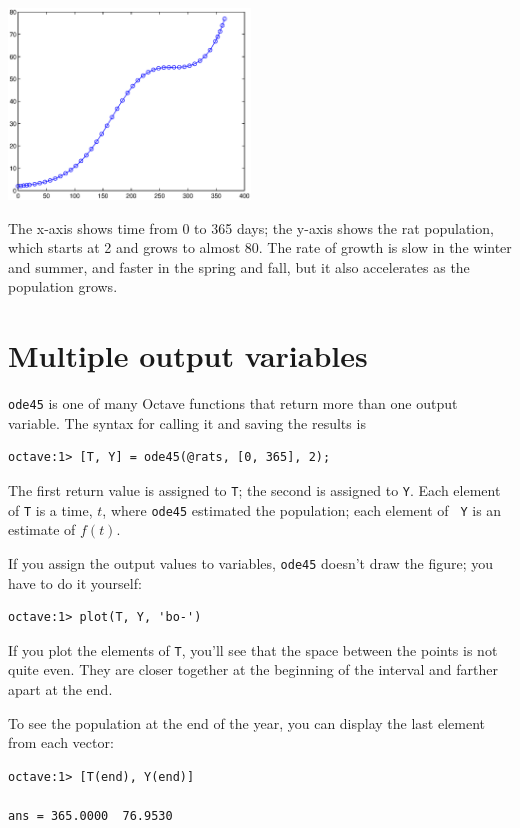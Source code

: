 \documentclass{book}
\begin{document}
\beforefig \centerline{\includegraphics[height=2in]{figs/rats.eps}}

The x-axis shows time from 0 to 365 days; the y-axis shows the rat
population, which starts at 2 and grows to almost 80. The rate
of growth is slow in the winter and summer, and faster in the
spring and fall, but it also accelerates as the population grows.


\section{Multiple output variables}
\label{rats}

{\tt ode45} is one of many Octave functions that return more
than one output variable. The syntax for calling it and saving
the results is

\begin{verbatim}
octave:1> [T, Y] = ode45(@rats, [0, 365], 2);
\end{verbatim}

The first return value is assigned to {\tt T}; the second is assigned
to {\tt Y}. Each element of {\tt T} is a time,
$t$, where {\tt ode45} estimated the population; each element of {\tt
Y} is an estimate of $f(t)$.

If you assign the output values to variables,
{\tt ode45} doesn't draw the figure;
you have to do it yourself:

\begin{verbatim}
octave:1> plot(T, Y, 'bo-')
\end{verbatim}

If you plot the elements of {\tt T}, you'll see that the
space between the points is not quite even. They are closer
together at the beginning of the interval and farther apart at the end.

To see the population at the end of the year, you can display the
last element from each vector:

\begin{verbatim}
octave:1> [T(end), Y(end)]

ans = 365.0000  76.9530
\end{verbatim}
\end{document}
